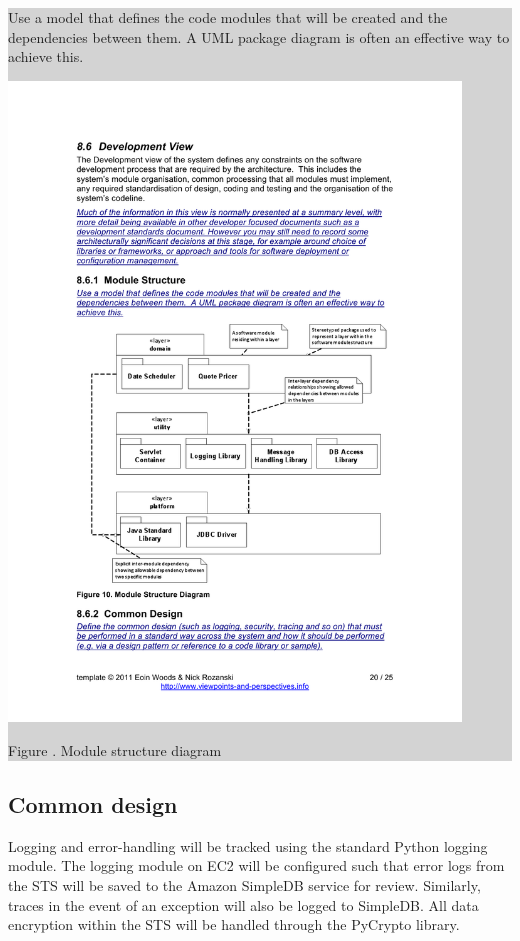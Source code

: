 \documentclass[a4paper,11pt]{report}
\newcommand{\instructions}[1]{
  \noindent\colorbox{lightgray}{%
    \parbox{\linewidth}{%
      #1
    }%
  }%
 \vspace{0.1cm}
}
\newcommand{\mycaption}[1]{
  \addtocounter{figures}{1}
  Figure \arabic{figures}. #1
}
\begin{document}
\instructions{
Use a model that defines the code modules that will be created and the
dependencies between them. A UML package diagram is often an effective
way to achieve this.

\begin{center}
  \includegraphics[width=0.9\textwidth]{figures/modulestructurediagram}\\
  \mycaption{Module structure diagram}
\end{center}

}

\subsection{Common design}
\label{sec:common-design}

Logging and error-handling will be tracked using the standard Python logging 
module. The logging module on EC2 will be configured such that error logs from
the STS will be saved to the Amazon SimpleDB service for review. Similarly,
traces in the event of an exception will also be logged to SimpleDB. All 
data encryption within the STS will be handled through the PyCrypto library.
\end{document}
